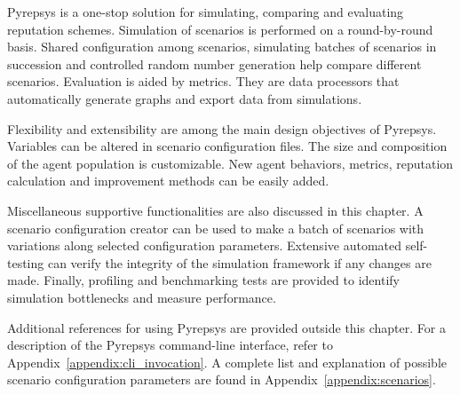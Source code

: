 \documentclass[%
    ]{\PathToTumTemplate/thesis/tum_thesis}
\begin{document}
Pyrepsys is a one-stop solution for simulating, comparing and evaluating reputation schemes.
Simulation of scenarios is performed on a round-by-round basis.
Shared configuration among scenarios, simulating batches of scenarios in succession and controlled random number generation help compare different scenarios.
Evaluation is aided by metrics.
They are data processors that automatically generate graphs and export data from simulations.

Flexibility and extensibility are among the main design objectives of Pyrepsys.
Variables can be altered in scenario configuration files.
The size and composition of the agent population is customizable.
New agent behaviors, metrics, reputation calculation and improvement methods can be easily added.

Miscellaneous supportive functionalities are also discussed in this chapter.
A scenario configuration creator can be used to make a batch of scenarios with variations along selected configuration parameters.
Extensive automated self-testing can verify the integrity of the simulation framework if any changes are made.
Finally, profiling and benchmarking tests are provided to identify simulation bottlenecks and measure performance.

Additional references for using Pyrepsys are provided outside this chapter.
For a description of the Pyrepsys command-line interface, refer to Appendix~\ref{appendix:cli_invocation}.
A complete list and explanation of possible scenario configuration parameters are found in Appendix~\ref{appendix:scenarios}.

\end{document}
